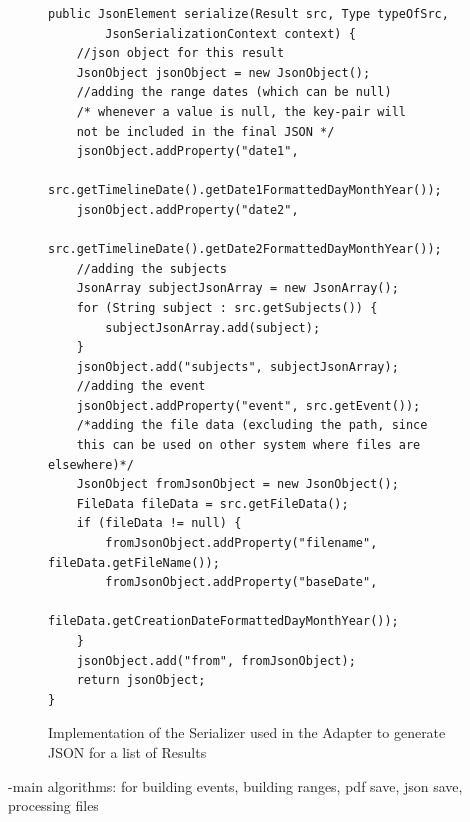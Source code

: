 \begin{figure}[H]
\begin{lstlisting}
public JsonElement serialize(Result src, Type typeOfSrc, 
		JsonSerializationContext context) {
    //json object for this result
    JsonObject jsonObject = new JsonObject();
	//adding the range dates (which can be null)
	/* whenever a value is null, the key-pair will 
	not be included in the final JSON */
	jsonObject.addProperty("date1", 
		src.getTimelineDate().getDate1FormattedDayMonthYear());
	jsonObject.addProperty("date2", 
		src.getTimelineDate().getDate2FormattedDayMonthYear());
	//adding the subjects
	JsonArray subjectJsonArray = new JsonArray();
	for (String subject : src.getSubjects()) {
		subjectJsonArray.add(subject);
	}
	jsonObject.add("subjects", subjectJsonArray);
	//adding the event
	jsonObject.addProperty("event", src.getEvent());
	/*adding the file data (excluding the path, since 
	this can be used on other system where files are elsewhere)*/
	JsonObject fromJsonObject = new JsonObject();
	FileData fileData = src.getFileData();
	if (fileData != null) {
		fromJsonObject.addProperty("filename", fileData.getFileName());
		fromJsonObject.addProperty("baseDate", 
			fileData.getCreationDateFormattedDayMonthYear());
	}
	jsonObject.add("from", fromJsonObject);
	return jsonObject;
}
\end{lstlisting}
\caption{Implementation of the Serializer used in the Adapter to generate JSON for a list of Results}
\label{fig:adapterGsonImplemented}
\end{figure}

-main algorithms: for building events, building ranges, pdf save, json save, processing files
